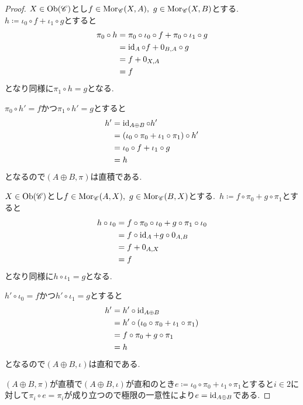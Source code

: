 \begin{proof}
$X \in \operatorname{Ob}(\mathscr{C})$とし$f \in \operatorname{Mor}_{\mathscr{C}}(X, A),\ g \in \operatorname{Mor}_{\mathscr{C}}(X, B)$とする.\
$h \coloneq \iota_0 \circ f + \iota_1 \circ g$とすると
\begin{align*}
\pi_0 \circ h &= \pi_0 \circ \iota_0 \circ f + \pi_0 \circ \iota_1 \circ g \\
	      &= \operatorname{id}_{A} \circ f + 0_{B, A} \circ g \\
	      &= f + 0_{X, A} \\
	      &= f
\end{align*}
となり同様に$\pi_1 \circ h = g$となる.

$\pi_0 \circ h' = f$かつ$\pi_1 \circ h' = g$とすると
\begin{align*}
h' &= \operatorname{id}_{A \oplus B} \circ h' \\
   &= (\iota_0 \circ  \pi_0 + \iota_1 \circ \pi_1) \circ h' \\
   &= \iota_0 \circ f + \iota_1 \circ g \\
   &= h
\end{align*}
となるので$(A \oplus B, \pi)$は直積である.\

$X \in \operatorname{Ob}(\mathscr{C})$とし$f \in \operatorname{Mor}_{\mathscr{C}}(A, X),\ g \in \operatorname{Mor}_{\mathscr{C}}(B, X)$とする.\
$h \coloneq f \circ \pi_0 + g \circ \pi_1$とすると
\begin{align*}
h \circ \iota_0 &= f \circ \pi_0 \circ \iota_0 + g \circ \pi_1 \circ \iota_0 \\
		&= f \circ \operatorname{id}_{A} + g \circ 0_{A, B} \\
		&= f + 0_{A, X} \\
		&= f
\end{align*}
となり同様に$h \circ \iota_1 = g$となる.

$h' \circ \iota_0 = f$かつ$h' \circ \iota_1 = g$とすると
\begin{align*}
h' &= h' \circ \operatorname{id}_{A \oplus B} \\
   &= h' \circ (\iota_0 \circ \pi_0 + \iota_1 \circ \pi_1) \\
   &= f \circ \pi_0 + g \circ \pi_1 \\
   &= h
\end{align*}
となるので$(A \oplus B, \iota)$は直和である.\

$(A \oplus B, \pi)$が直積で$(A \oplus B, \iota)$が直和のとき$e \coloneq \iota_0 \circ \pi_0 + \iota_1 \circ \pi_1$とすると$i \in 2$に対して$\pi_i \circ e = \pi_i$が成り立つので極限の一意性により$e = \operatorname{id}_{A \oplus B}$である.
\end{proof}


